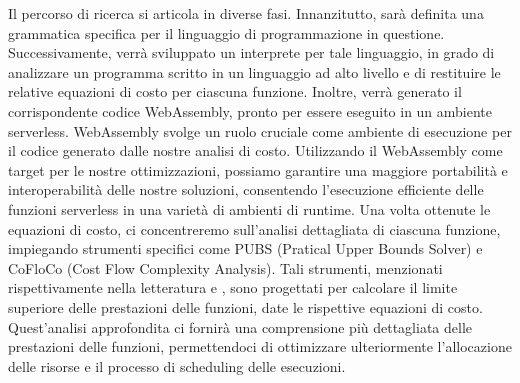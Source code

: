 \documentclass[../../main.tex]{subfiles}
\begin{document}
Il percorso di ricerca si articola in diverse fasi. Innanzitutto, sarà definita una grammatica specifica per il linguaggio di programmazione in questione. Successivamente, verrà sviluppato un interprete per tale linguaggio, in grado di analizzare un programma scritto in un linguaggio ad alto livello e di restituire le relative equazioni di costo per ciascuna funzione. Inoltre, verrà generato il corrispondente codice WebAssembly, pronto per essere eseguito in un ambiente serverless.
WebAssembly svolge un ruolo cruciale come ambiente di esecuzione per il codice generato dalle nostre analisi di costo. Utilizzando il WebAssembly come target per le nostre ottimizzazioni, possiamo garantire una maggiore portabilità e interoperabilità delle nostre soluzioni, consentendo l'esecuzione efficiente delle funzioni serverless in una varietà di ambienti di runtime.
Una volta ottenute le equazioni di costo, ci concentreremo sull'analisi dettagliata di ciascuna funzione, impiegando strumenti specifici come PUBS (Pratical Upper Bounds Solver) e CoFloCo (Cost Flow Complexity Analysis). Tali strumenti, menzionati rispettivamente nella letteratura \autocite{albert2008automatic} e \autocite{flores2014resource}, sono progettati per calcolare il limite superiore delle prestazioni delle funzioni, date le rispettive equazioni di costo. Quest'analisi approfondita ci fornirà una comprensione più dettagliata delle prestazioni delle funzioni, permettendoci di ottimizzare ulteriormente l'allocazione delle risorse e il processo di scheduling delle esecuzioni.
\end{document}
